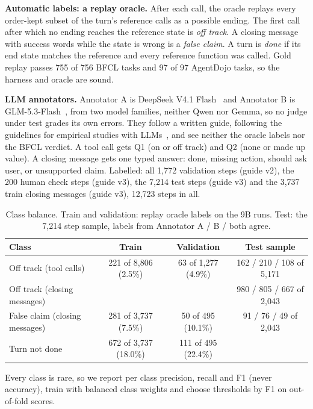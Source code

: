 \documentclass[10pt,a4paper]{article}
\newcommand{\tablestyle}{\footnotesize\rowcolors{2}{rowshade}{white}}
\begin{document}
\textbf{Automatic labels: a replay oracle.} After each call, the oracle replays every order-kept subset of the turn's reference calls as a possible ending. The first call after which no ending reaches the reference state is \emph{off track}. A closing message with success words while the state is wrong is a \emph{false claim}. A turn is \emph{done} if its end state matches the reference and every reference function was called. Gold replay passes 755 of 756 BFCL tasks and 97 of 97 AgentDojo tasks, so the harness and oracle are sound.

\textbf{LLM annotators.} Annotator A is DeepSeek V4.1 Flash~\cite{deepseek} and Annotator B is GLM-5.3-Flash~\cite{glm}, from two model families, neither Qwen nor Gemma, so no judge under test grades its own errors. They follow a written guide, following the guidelines for empirical studies with LLMs~\cite{baltes}, and see neither the oracle labels nor the BFCL verdict. A tool call gets Q1 (on or off track) and Q2 (none or made up value). A closing message gets one typed answer: done, missing action, should ask user, or unsupported claim. Labelled: all 1,772 validation steps (guide v2), the 200 human check steps (guide v3), the 7,214 test steps (guide v3) and the 3,737 train closing messages (guide v3), 12,723 steps in all.

\begin{table}[H]
\centering\tablestyle
\caption{Class balance. Train and validation: replay oracle labels on the 9B runs. Test: the 7,214 step sample, labels from Annotator A / B / both agree.}\label{tab:balance}
\begin{tabularx}{\linewidth}{Yccc}
\toprule
\textbf{Class} & \textbf{Train} & \textbf{Validation} & \textbf{Test sample} \\
\midrule
Off track (tool calls) & 221 of 8,806 (2.5\%) & 63 of 1,277 (4.9\%) & 162 / 210 / 108 of 5,171 \\
Off track (closing messages) & & & 980 / 805 / 667 of 2,043 \\
False claim (closing messages) & 281 of 3,737 (7.5\%) & 50 of 495 (10.1\%) & 91 / 76 / 49 of 2,043 \\
Turn not done & 672 of 3,737 (18.0\%) & 111 of 495 (22.4\%) & \\
\bottomrule
\end{tabularx}
\end{table}
Every class is rare, so we report per class precision, recall and F1 (never accuracy), train with balanced class weights and choose thresholds by F1 on out-of-fold scores.
\end{document}
